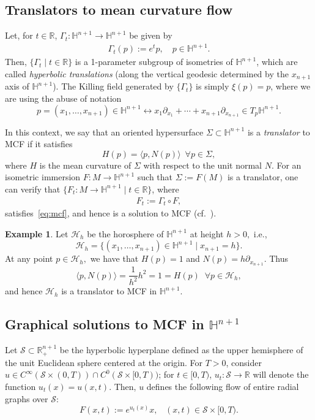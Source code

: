 \documentclass{amsart}[12pt]
\newcommand{\hn}[1]{\h^{#1}}
\newcommand{\cS}{\mathcal{S}}
\theoremstyle{definition}
\newtheorem{example}[theorem]{Example}
\theoremstyle{plain}
\newcommand{\R}{\mathbb{R} }
\newcommand{\h}{\mathbb{H} }
\renewcommand{\Sigma}{\varSigma}
\begin{document}
\subsection{Translators to mean curvature flow} \label{sec-MCF}
Let, for $t\in\R$,
$\Gamma_t\colon \hn{n+1}\to \hn{n+1}$ be given by
\begin{align}\label{eqtranslhyp}
\Gamma_t(p):= e^tp, \quad p\in\h^{n+1}.
\end{align}
Then, $\{\Gamma_t\mid t\in \R\}$
is a 1-parameter subgroup of isometries of $\h^{n+1}$,
which are called
\emph{hyperbolic translations} (along the
vertical geodesic determined by the $x_{n+1}$ axis of $\h^{n+1}$).
The Killing field generated by $\{\Gamma_t\}$ is simply
$\xi(p) = p$, where we are using the abuse of notation
\begin{equation*}
p=(x_1,\dots, x_{n+1})\in \h^{n+1} \leftrightarrow x_1\partial_{x_1}+ \cdots +x_{n+1}\partial_{x_{n+1}}\in T_p\h^{n+1}.
\end{equation*}

In this context, we say that an oriented hypersurface
$\Sigma\subset\h^{n+1}$ is a \emph{translator}
to MCF if it satisfies
\begin{equation} \label{eq-translatorH301}
H(p)=\langle p,N(p)\rangle \,\,\,\forall p\in\Sigma,
\end{equation}
where $H$ is the mean curvature of $\Sigma$ with respect to
the unit normal $N$.
For an isometric immersion $F\colon M\to\h^{n+1}$
such that
$\Sigma:=F(M)$ is a translator, one can verify that
$\{F_t\colon M \to \hn{n+1}\mid t\in\R\}$, where
\begin{align*}
F_t:=\Gamma_t\circ F,
\end{align*}
satisfies~\eqref{eq:mcf}, and hence is a solution to MCF (cf.~\cite{hungerbuhler-smoczyk}).


\begin{example}\label{eghorosp}
Let $\mathscr H_h$ be the horosphere of $\h^{n+1}$
at height $h>0,$ i.e.,
\[
\mathscr H_h=\{(x_1,\dots ,x_{n+1})\in\h^{n+1}\mid x_{n+1}=h\}.
\]
At any point $p\in\mathscr H_h,$ we have that
$H(p)=1$ and $N(p)=h\partial_{x_{n+1}}.$ Thus
\[
\langle p,N(p)\rangle=\frac1{h^2}h^2=1=H(p) \,\,\ \forall p\in\mathscr H_h,
\]
and hence $\mathscr H_h$ is a translator to MCF in $\h^{n+1}.$
\end{example}


\subsection{Graphical solutions to MCF in $\h^{n+1}$}
Let $\mathcal S\subset\R^{n+1}_+$ be the hyperbolic hyperplane defined as the
upper hemisphere of the unit Euclidean sphere centered at the origin.
For $T>0$, consider $u\in C^{\infty}(\mathcal S\times (0,T))
\cap C^{0}(\mathcal S\times [0,T))$; for $t\in [0,T)$,
$u_t\colon \cS\to \R$ will denote the function $u_t(x) = u(x,t)$.
Then, $u$ defines the following flow of entire
radial graphs over $\mathcal S$:
\begin{equation} \label{eq-map}
F(x,t):=e^{u_t(x)}x, \,\,\,\,\, (x,t)\in\mathcal S\times[0, T).
\end{equation}
\end{document}
